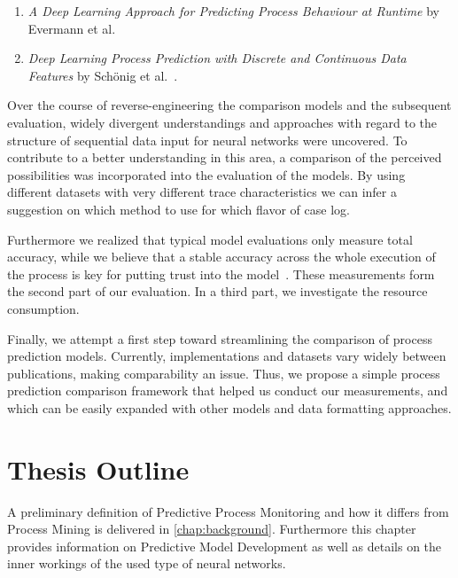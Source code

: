 \begin{enumerate}
    \item \textit{A Deep Learning Approach for Predicting Process Behaviour at Runtime} by Evermann et al.~\cite{evermann2016}
    \item\textit{Deep Learning Process Prediction with Discrete and Continuous Data Features} by Schönig et al.~\cite{schoenig2018}.
\end{enumerate}

Over the course of reverse-engineering the comparison models and the subsequent evaluation, widely divergent understandings and approaches with regard to the structure of sequential data input for neural networks were uncovered. To contribute to a better understanding in this area, a comparison of the perceived possibilities was incorporated into the evaluation of the models. By using different datasets with very different trace characteristics we can infer a suggestion on which method to use for which flavor of case log.

Furthermore we realized that typical model evaluations only measure total accuracy, while we believe that a stable accuracy across the whole execution of the process is key for putting trust into the model~\cite{francescomarino2015, boehmer2018probability}. These measurements form the second part of our evaluation. In a third part, we investigate the resource consumption.

Finally, we attempt a first step toward streamlining the comparison of process prediction models. Currently, implementations and datasets vary widely between publications, making comparability an issue. Thus, we propose a simple process prediction comparison framework that helped us conduct our measurements, and which can be easily expanded with other models and data formatting approaches.

\section{Thesis Outline}\label{sec:intro:outline}
A preliminary definition of Predictive Process Monitoring and how it differs from Process Mining is delivered in \autoref{chap:background}. Furthermore this chapter provides information on Predictive Model Development as well as details on the inner workings of the used type of neural networks.

